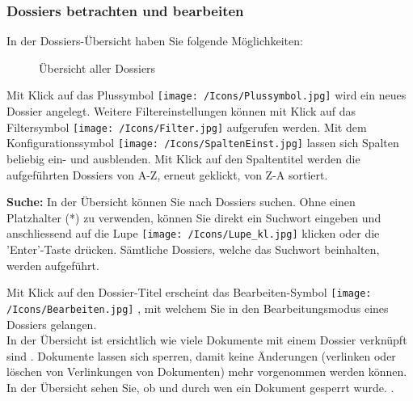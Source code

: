 \subsubsection{Dossiers betrachten und bearbeiten}

In der Dossiers-Übersicht haben Sie folgende Möglichkeiten:

\begin{figure}[H]
\caption{Übersicht aller Dossiers}
\end{figure}

Mit Klick auf das Plussymbol \texttt{[image: /Icons/Plussymbol.jpg]}  wird ein neues Dossier angelegt. Weitere Filtereinstellungen können mit Klick auf das Filtersymbol \texttt{[image: /Icons/Filter.jpg]}  aufgerufen werden. Mit dem Konfigurationssymbol \texttt{[image: /Icons/SpaltenEinst.jpg]}  lassen sich Spalten beliebig ein- und ausblenden. Mit Klick auf den Spaltentitel  werden die aufgeführten Dossiers von A-Z, erneut geklickt, von Z-A sortiert.

\vspace{\baselineskip}

\textbf{Suche:} In der Übersicht können Sie nach Dossiers suchen. Ohne einen Platzhalter (*) zu verwenden, können Sie direkt ein Suchwort eingeben und anschliessend auf die Lupe \texttt{[image: /Icons/Lupe\_kl.jpg]}  klicken oder die 'Enter'-Taste drücken. Sämtliche Dossiers, welche das Suchwort beinhalten, werden aufgeführt. \newline

Mit Klick auf den Dossier-Titel  erscheint das Bearbeiten-Symbol \texttt{[image: /Icons/Bearbeiten.jpg]} , mit welchem Sie in den Bearbeitungsmodus eines Dossiers gelangen. \\

In der Übersicht ist ersichtlich wie viele Dokumente mit einem Dossier verknüpft sind .
Dokumente lassen sich sperren, damit keine Änderungen (verlinken oder löschen von Verlinkungen von Dokumenten) mehr vorgenommen werden können. In der Übersicht sehen Sie, ob und durch wen ein Dokument gesperrt wurde. .

